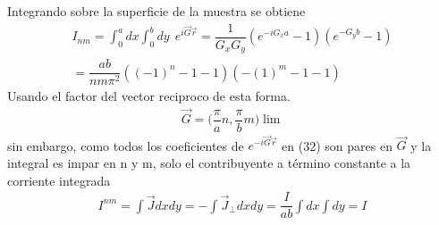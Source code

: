 \documentclass[a4paper,11pt,]{book}
\begin{document}
Integrando sobre la superficie de la muestra se obtiene 
\begin{eqnarray}
\nonumber I_{nm} =\int^{a}_0 dx \int^{b}_0 dy \ \ e^{i\vec{G}\vec{r}}=\dfrac{1}{G_x G_y} (e^{-iG_xa}-1) (e^{-G_y b}-1) \\ =\dfrac{ab}{nm \pi^2} ((-1)^n-1-1)(-(1)^m-1-1)
\end{eqnarray}
Usando el factor del vector reciproco de esta forma.
\begin{eqnarray}
\vec{G}=\bigg(\dfrac{\pi}{a}n,\dfrac{\pi}{b}m\bigg)\lim
\end{eqnarray}
sin embargo, como todos los coeficientes de $ e^{- i \vec{G} \vec{r}} $ en (32) son pares en $ \vec{G} $ y la integral es impar en n y m, solo el contribuyente a término constante a la corriente integrada
\begin{eqnarray}
\nonumber I^{nm} =\int \vec{J} dx  dy =-\int \vec{J}_\perp dx  dy=\dfrac{I}{ab}\int dx \int dy=I
\end{eqnarray}
\end{document}
